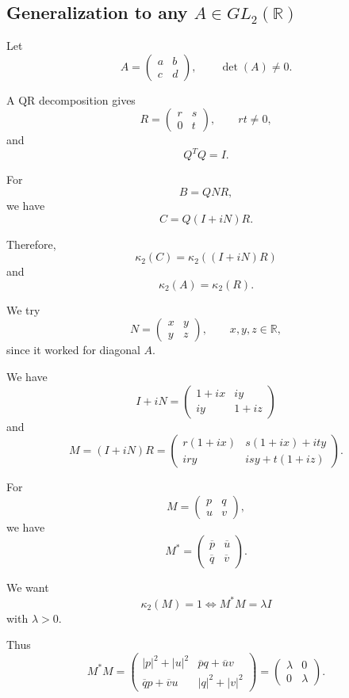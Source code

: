 \documentclass[11pt, reqno, a4paper]{amsart}
\theoremstyle{plain}
\theoremstyle{definition}
\theoremstyle{remark}
\numberwithin{equation}{section}
\begin{document}
\subsection{Generalization to any $A\in GL_2(\mathbb{R})$}

Let
\[
A=
\begin{pmatrix}
a&b\\
c&d
\end{pmatrix},
\qquad
\det(A)\neq0.
\]

A QR decomposition gives
\[
R=
\begin{pmatrix}
r&s\\
0&t
\end{pmatrix},
\qquad rt\neq0,
\]
and
\[
Q^TQ=I.
\]

For
\[
B=QNR,
\]
we have
\[
C=Q(I+iN)R.
\]

Therefore,
\[
\kappa_2(C)=\kappa_2((I+iN)R)
\]
and
\[
\kappa_2(A)=\kappa_2(R).
\]

We try
\[
N=
\begin{pmatrix}
x&y\\
y&z
\end{pmatrix},
\qquad x,y,z\in\mathbb{R},
\]
since it worked for diagonal $A$.

We have
\[
I+iN=
\begin{pmatrix}
1+ix&iy\\
iy&1+iz
\end{pmatrix}
\]
and
\[
M=(I+iN)R
=
\begin{pmatrix}
r(1+ix)&s(1+ix)+ity\\
iry&isy+t(1+iz)
\end{pmatrix}.
\]

For
\[
M=
\begin{pmatrix}
p&q\\
u&v
\end{pmatrix},
\]
we have
\[
M^*=
\begin{pmatrix}
\overline p&\overline u\\
\overline q&\overline v
\end{pmatrix}.
\]

We want
\[
\kappa_2(M)=1
\iff
M^*M=\lambda I
\]
with $\lambda>0$.

Thus
\[
M^*M
=
\begin{pmatrix}
|p|^2+|u|^2&\overline p q+\overline u v\\
\overline q p+\overline v u&|q|^2+|v|^2
\end{pmatrix}
=
\begin{pmatrix}
\lambda&0\\
0&\lambda
\end{pmatrix}.
\]
\end{document}
